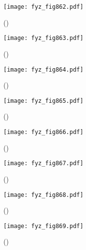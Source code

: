     \begin{figure}[ht!] %
      \centering
      \texttt{[image: fyz\_fig862.pdf]}
      \caption{
               (\cite[s.~707]{Feynman02})}
      \label{fyz_fig862}
    \end{figure}

    \begin{figure}[ht!] %
      \centering
      \texttt{[image: fyz\_fig863.pdf]}
      \caption{
               (\cite[s.~707]{Feynman02})}
      \label{fyz_fig863}
    \end{figure}

    \begin{figure}[ht!] %
      \centering
      \texttt{[image: fyz\_fig864.pdf]}
      \caption{
               (\cite[s.~707]{Feynman02})}
      \label{fyz_fig864}
    \end{figure}

    \begin{figure}[ht!] %
      \centering
      \texttt{[image: fyz\_fig865.pdf]}
      \caption{
               (\cite[s.~707]{Feynman02})}
      \label{fyz_fig865}
    \end{figure}

    \begin{figure}[ht!] %
      \centering
      \texttt{[image: fyz\_fig866.pdf]}
      \caption{
               (\cite[s.~707]{Feynman02})}
      \label{fyz_fig866}
    \end{figure}

    \begin{figure}[ht!] %
      \centering
      \texttt{[image: fyz\_fig867.pdf]}
      \caption{
               (\cite[s.~707]{Feynman02})}
      \label{fyz_fig867}
    \end{figure}

    \begin{figure}[ht!] %
      \centering
      \texttt{[image: fyz\_fig868.pdf]}
      \caption{
               (\cite[s.~707]{Feynman02})}
      \label{fyz_fig868}
    \end{figure}

    \begin{figure}[ht!] %
      \centering
      \texttt{[image: fyz\_fig869.pdf]}
      \caption{
               (\cite[s.~707]{Feynman02})}
      \label{fyz_fig869}
    \end{figure}

